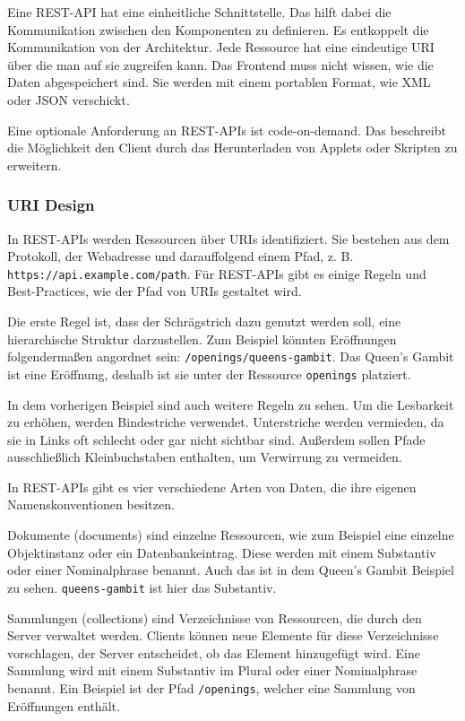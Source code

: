 Eine REST-API hat eine einheitliche Schnittstelle. Das hilft dabei die Kommunikation zwischen den Komponenten zu definieren. Es entkoppelt die Kommunikation von der Architektur. Jede Ressource hat eine eindeutige URI über die man auf sie zugreifen kann. Das Frontend muss nicht wissen, wie die Daten abgespeichert sind. Sie werden mit einem portablen Format, wie XML oder JSON verschickt.

Eine optionale Anforderung an REST-APIs ist code-on-demand. Das beschreibt die Möglichkeit den Client durch das Herunterladen von Applets oder Skripten zu erweitern.
\cite{fielding_architectural_2000,de_api_2017}

\subsubsection{URI Design}
In REST-APIs werden Ressourcen über \ac{URI}s identifiziert. Sie bestehen aus dem Protokoll, der Webadresse und darauffolgend einem Pfad, z. B. \lstinline[language={}]{https://api.example.com/path}. Für REST-APIs gibt es einige Regeln und Best-Practices, wie der Pfad von \ac{URI}s gestaltet wird.

Die erste Regel ist, dass der Schrägstrich dazu genutzt werden soll, eine hierarchische Struktur darzustellen. Zum Beispiel könnten Eröffnungen folgendermaßen angordnet sein: \lstinline{/openings/queens-gambit}. Das Queen's Gambit ist eine Eröffnung, deshalb ist sie unter der Ressource \lstinline{openings} platziert.

In dem vorherigen Beispiel sind auch weitere Regeln zu sehen. Um die Lesbarkeit zu erhöhen, werden Bindestriche verwendet. Unterstriche werden vermieden, da sie in Links oft schlecht oder gar nicht sichtbar sind. Außerdem sollen Pfade ausschließlich Kleinbuchstaben enthalten, um Verwirrung zu vermeiden.

In REST-APIs gibt es vier verschiedene Arten von Daten, die ihre eigenen Namenskonventionen besitzen.

Dokumente (documents) sind einzelne Ressourcen, wie zum Beispiel eine einzelne Objektinstanz oder ein Datenbankeintrag. Diese werden mit einem Substantiv oder einer Nominalphrase benannt. Auch das ist in dem Queen's Gambit Beispiel zu sehen. \lstinline{queens-gambit} ist hier das Substantiv.

Sammlungen (collections) sind Verzeichnisse von Ressourcen, die durch den Server verwaltet werden. Clients können neue Elemente für diese Verzeichnisse vorschlagen, der Server entscheidet, ob das Element hinzugefügt wird. Eine Sammlung wird mit einem Substantiv im Plural oder einer Nominalphrase benannt. Ein Beispiel ist der Pfad \lstinline{/openings}, welcher eine Sammlung von Eröffnungen enthält.

